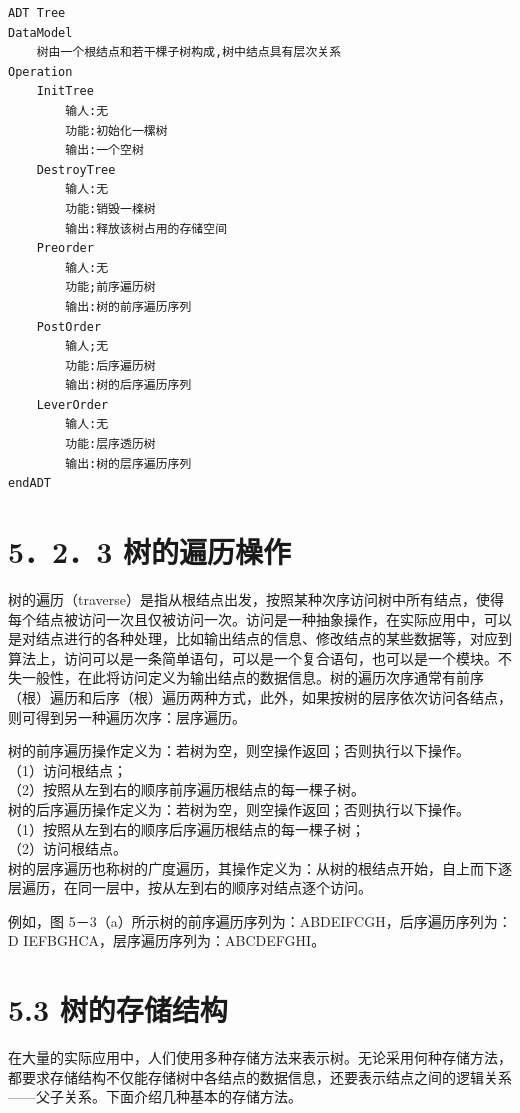 \documentclass[10pt]{article}
\begin{document}
\begin{verbatim}
ADT Tree
DataModel
    树由一个根结点和若干棵子树构成,树中结点具有层次关系
Operation
    InitTree
        输人:无
        功能:初始化一樏树
        输出:一个空树
    DestroyTree
        输人:无
        功能:销毁一檪树
        输出:释放该树占用的存储空间
    Preorder
        输人:无
        功能;前序遍历树
        输出:树的前序遍历序列
    PostOrder
        输人;无
        功能:后序遍历树
        输出:树的后序遍历序列
    LeverOrder
        输人:无
        功能:层序透历树
        输出:树的层序遍历序列
endADT
\end{verbatim}

\section*{5．2．3 树的遍历橾作}
树的遍历（traverse）是指从根结点出发，按照某种次序访问树中所有结点，使得每个结点被访问一次且仅被访问一次。访问是一种抽象操作，在实际应用中，可以是对结点进行的各种处理，比如输出结点的信息、修改结点的某些数据等，对应到算法上，访问可以是一条简单语句，可以是一个复合语句，也可以是一个模块。不失一般性，在此将访问定义为输出结点的数据信息。树的遍历次序通常有前序（根）遍历和后序（根）遍历两种方式，此外，如果按树的层序依次访问各结点，则可得到另一种遍历次序：层序遍历。

树的前序遍历操作定义为：若树为空，则空操作返回；否则执行以下操作。\\
（1）访问根结点；\\
（2）按照从左到右的顺序前序遍历根结点的每一棵子树。\\
树的后序遍历操作定义为：若树为空，则空操作返回；否则执行以下操作。\\
（1）按照从左到右的顺序后序遍历根结点的每一棵子树；\\
（2）访问根结点。\\
树的层序遍历也称树的广度遍历，其操作定义为：从树的根结点开始，自上而下逐层遍历，在同一层中，按从左到右的顺序对结点逐个访问。

例如，图 5－3（a）所示树的前序遍历序列为：ABDEIFCGH，后序遍历序列为：D IEFBGHCA，层序遍历序列为：ABCDEFGHI。

\section*{5.3 树的存储结构}
在大量的实际应用中，人们使用多种存储方法来表示树。无论采用何种存储方法，都要求存储结构不仅能存储树中各结点的数据信息，还要表示结点之间的逻辑关系——父子关系。下面介绍几种基本的存储方法。
\end{document}
